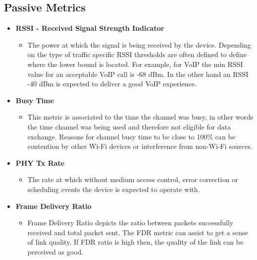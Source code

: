 \subsection*{Passive Metrics}

\begin{itemize}
	\item \textbf{RSSI - Received Signal Strength Indicator}
	\begin{itemize}
		\item The power at which the signal is being received by the device. Depending on the type of traffic specific RSSI thresholds are often defined to define where the lower bound is located. For example, for VoIP the min RSSI value for an acceptable VoIP call is -68 dBm. In the other hand an RSSI -40 dBm is expected to deliver a good VoIP experience.
	\end{itemize}
	\hfill \break
	\item \textbf{Busy Time}
	\begin{itemize}
		\item This metric is associated to the time the channel was busy, in other words the time channel was being used and therefore not eligible for data exchange. Reasons for channel busy time to be close to 100\% can be contention by other Wi-Fi devices or interference from non-Wi-Fi sources.
	\end{itemize}
	
	\item \textbf{PHY Tx Rate}
	\begin{itemize}
		\item 	The rate at which without medium access control, error correction or scheduling events the device is expected to operate with.
	\end{itemize}
	
	\item \textbf{Frame Delivery Ratio}
	\begin{itemize}
		\item Frame Delivery Ratio depicts the ratio between packets successfully received and total packet sent. The FDR metric can assist to get a sense of link quality. If FDR ratio is high then, the quality of the link can be perceived as good.
	\end{itemize}

\end{itemize}

